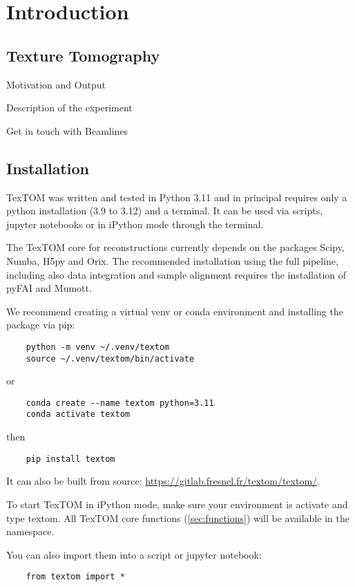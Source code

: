 \section{Introduction}

\subsection{Texture Tomography}

Motivation and Output

Description of the experiment

Get in touch with Beamlines

\subsection{Installation}

TexTOM was written and tested in Python 3.11 and in principal requires only a python installation (3.9 to 3.12) and a terminal.
It can be used via scripts, jupyter notebooks or in iPython mode through the terminal.

The TexTOM core for reconstructions currently depends on the packages Scipy, Numba, H5py and Orix.
The recommended installation using the full pipeline, including also data integration and sample alignment requires the installation of pyFAI and Mumott.

We recommend creating a virtual venv or conda environment and installing the package via pip:

\begin{verbatim}
    python -m venv ~/.venv/textom
    source ~/.venv/textom/bin/activate
\end{verbatim}
or
\begin{verbatim}
    conda create --name textom python=3.11
    conda activate textom
\end{verbatim}
then
\begin{verbatim}
    pip install textom
\end{verbatim}

It can also be built from source: 
\url{https://gitlab.fresnel.fr/textom/textom/}.

To start TexTOM in iPython mode, make sure your environment is activate and type textom.
All TexTOM core functions (\ref{sec:functions}) will be available in the namespace.

You can also import them into a script or jupyter notebook:
\begin{verbatim}
    from textom import *
\end{verbatim}

